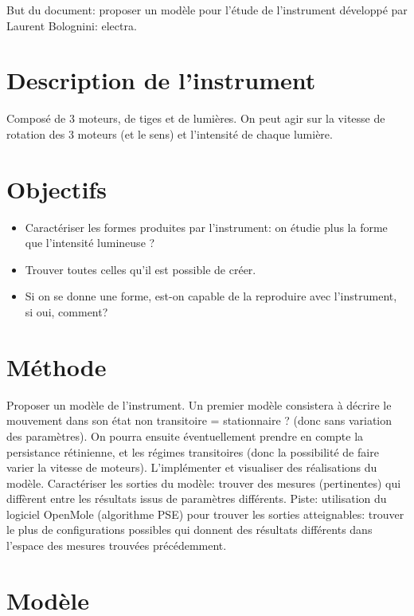 \documentclass[11pt,a4paper]{article}
\begin{document}
But du document: proposer un modèle pour l'étude de l'instrument développé par Laurent Bolognini: electra.

\section{Description de l'instrument}
Composé de 3 moteurs, de tiges et de lumières.
On peut agir sur la vitesse de rotation des 3 moteurs (et le sens) et l'intensité de chaque lumière.


\section{Objectifs}
\begin{itemize}
\item Caractériser les formes produites par l'instrument: on étudie plus la forme que l'intensité lumineuse ?
\item Trouver toutes celles qu'il est possible de créer.
\item Si on se donne une forme, est-on capable de la reproduire avec l'instrument, si oui, comment?
\end{itemize}

\section{Méthode}
Proposer un modèle de l'instrument. Un premier modèle consistera à décrire le mouvement dans son état non transitoire = stationnaire ? (donc sans variation des paramètres).
On pourra ensuite éventuellement prendre en compte la persistance rétinienne, et les régimes transitoires (donc la possibilité de faire varier la vitesse de moteurs).
L'implémenter et visualiser des réalisations du modèle.
Caractériser les sorties du modèle: trouver des mesures (pertinentes) qui diffèrent entre les résultats issus de paramètres différents.
Piste: utilisation du logiciel OpenMole (algorithme PSE) pour trouver les sorties atteignables: trouver le plus de configurations possibles qui donnent des résultats différents dans l'espace des mesures trouvées précédemment.


\section{Modèle}
\end{document}
